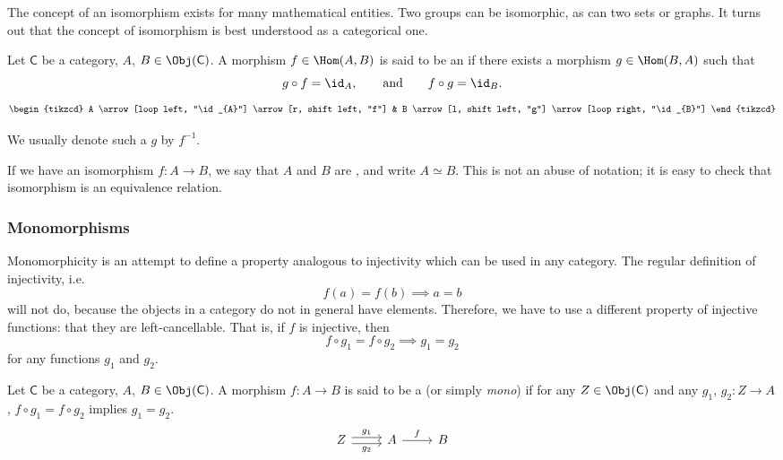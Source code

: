\documentclass[notes.tex]{subfiles}
\begin{document}
The concept of an isomorphism exists for many mathematical entities. Two groups can be isomorphic, as can two sets or graphs. It turns out that the concept of isomorphism is best understood as a categorical one.
\begin{definition}[isomorphism]
  \label{def:isomorphism}
  Let $\mathsf{C}$ be a category, $A$, $B \in \Obj(\mathsf{C})$. A morphism $f \in \Hom(A,B)$ is said to be an  if there exists a morphism $g \in \Hom(B,A)$ such that
  \begin{equation*}
    g \circ f = \id_{A},\qquad\text{and}\qquad f \circ g = \id_{B}.
  \end{equation*}
  \begin{equation*}
    \begin{tikzcd}
      A
      \arrow[loop left, "\id_{A}"]
      \arrow[r, shift left, "f"]
      & B
      \arrow[l, shift left, "g"]
      \arrow[loop right, "\id_{B}"]
    \end{tikzcd}
  \end{equation*}

  We usually denote such a $g$ by $f^{-1}$.

  If we have an isomorphism $f\colon A \to B$, we say that $A$ and $B$ are , and write $A \simeq B$. This is not an abuse of notation; it is easy to check that isomorphism is an equivalence relation.
\end{definition}


\subsubsection{Monomorphisms}

Monomorphicity is an attempt to define a property analogous to injectivity which can be used in any category. The regular definition of injectivity, i.e.\
\begin{equation*}
  f(a) = f(b) \implies a = b
\end{equation*}
will not do, because the objects in a category do not in general have elements. Therefore, we have to use a different property of injective functions: that they are left-cancellable. That is, if $f$ is injective, then
\begin{equation*}
  f \circ g_{1} = f \circ g_{2} \implies g_{1} = g_{2}
\end{equation*}
for any functions $g_{1}$ and $g_{2}$.

\begin{definition}[monomorphism]
  \label{def:monomorphism}
  Let $\mathsf{C}$ be a category, $A$, $B\in \Obj(\mathsf{C})$. A morphism $f\colon A \to B$ is said to be a  (or simply \emph{mono}) if for any $Z \in \Obj(\mathsf{C})$ and any $g_{1}$, $g_{2}\colon Z \to A$, $f \circ g_{1} = f\circ g_{2}$ implies $g_{1} = g_{2}$.
  \begin{equation*}
    \begin{tikzcd}
      Z \arrow[r, shift left, "g_{1}"] \arrow[r, shift right, swap, "g_{2}"] & A \arrow[r, "f"] & B
    \end{tikzcd}
  \end{equation*}
\end{definition}
\end{document}
